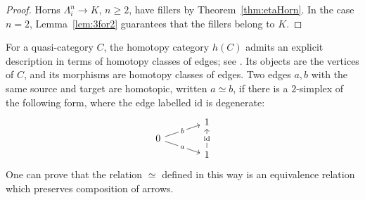\documentclass{article}
\theoremstyle{plain}
\theoremstyle{definition}
\theoremstyle{remark}
\begin{document}
\begin{proof}
    Horns $\Lambda^n_i\rightarrow K$, $n\geq 2$, have fillers by Theorem~\ref{thm:etaHorn}. In the case $n=2$, Lemma~\ref{lem:3for2} guarantees that the fillers belong to $K$.
\end{proof}
For a quasi-category $C$, the homotopy category $h(C)$
admits an explicit description in terms of homotopy classes
of edges; see \cite[Section~1.6]{Cisinski2019}. Its objects are the vertices
of $C$, and its morphisms are homotopy classes of edges.
Two edges $a,b$ with the same source and target are homotopic,
written $a\simeq b$, if there is a $2$-simplex of the following
form, where the edge labelled $\mathrm{id}$ is degenerate:
 \begin{equation}
        \begin{tikzcd}[row sep = 0.3em, column sep=3.6em]
            &{1}\\
            {0}\arrow[ur,"b"{description}]\arrow[dr,"a"{description}]\\
            &{1}\arrow[uu,"\mathrm{id}"{description}]
        \end{tikzcd}
    \end{equation}
One can prove that the relation $\simeq$ defined in this way is an equivalence relation which preserves composition of arrows.
\end{document}
